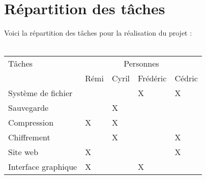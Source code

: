 \newpage

\section{Répartition des tâches}
    
    Voici la répartition des tâches pour la réalisation du projet : \\ \\

    {\normalsize
    	\begin{tabular}{|p{6cm}|p{1.6cm}|p{1.6cm}|p{1.6cm}|p{1.6cm}|}
    		\hline
    		Tâches & \multicolumn{4}{|c|}{Personnes} \\ 
    		\cline{2-5}
    			& Rémi & Cyril & Frédéric & Cédric \\
    		\hline
    		Système de fichier &  &  & X & X \\
    		\hline
    		Sauvegarde &  & X &  &  \\
    		\hline
    		Compression & X & X &  &  \\
    		\hline
    		Chiffrement &  & X &  & X \\
    		\hline
    		Site web & X &  &  & X \\
    		\hline
    		Interface graphique & X &  & X &  \\
    		\hline
    	\end{tabular}
    	\label{répartition}		
    }
